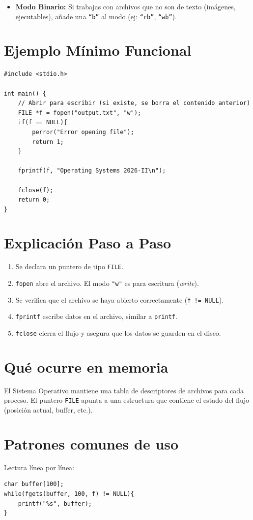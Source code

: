 \documentclass[12pt,a4paper]{article}
\begin{document}
\begin{itemize}
    \item \textbf{Modo Binario:} Si trabajas con archivos que no son de texto (imágenes, ejecutables), añade una \texttt{``b''} al modo (ej: \texttt{``rb''}, \texttt{``wb''}).
\end{itemize}

\section{Ejemplo Mínimo Funcional}
\begin{lstlisting}
#include <stdio.h>

int main() {
    // Abrir para escribir (si existe, se borra el contenido anterior)
    FILE *f = fopen("output.txt", "w");
    if(f == NULL){
        perror("Error opening file");
        return 1;
    }

    fprintf(f, "Operating Systems 2026-II\n");
    
    fclose(f);
    return 0;
}
\end{lstlisting}

\section{Explicación Paso a Paso}
\begin{enumerate}
    \item Se declara un puntero de tipo \texttt{FILE}.
    \item \texttt{fopen} abre el archivo. El modo \texttt{"w"} es para escritura (\textit{write}).
    \item Se verifica que el archivo se haya abierto correctamente (\texttt{f != NULL}).
    \item \texttt{fprintf} escribe datos en el archivo, similar a \texttt{printf}.
    \item \texttt{fclose} cierra el flujo y asegura que los datos se guarden en el disco.
\end{enumerate}

\section{Qué ocurre en memoria}
El Sistema Operativo mantiene una tabla de descriptores de archivos para cada proceso. El puntero \texttt{FILE} apunta a una estructura que contiene el estado del flujo (posición actual, buffer, etc.).

\section{Patrones comunes de uso}
Lectura línea por línea:
\begin{lstlisting}
char buffer[100];
while(fgets(buffer, 100, f) != NULL){
    printf("%s", buffer);
}
\end{lstlisting}
\end{document}
